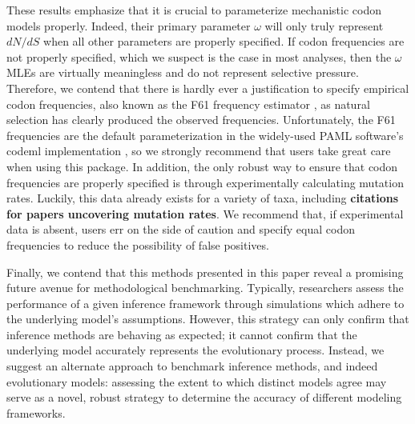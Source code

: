 \documentclass[11pt]{article}
\begin{document}
These results emphasize that it is crucial to parameterize mechanistic codon models properly. Indeed, their primary parameter $\omega$ will only truly represent $dN/dS$ when all other parameters are properly specified. If codon frequencies are not properly specified, which we suspect is the case in most analyses, then the $\omega$ MLEs are virtually meaningless and do not represent selective pressure. Therefore, we contend that there is hardly ever a justification to specify empirical codon frequencies, also known as the F61 frequency estimator \cite{GoldmanYang1994}, as natural selection has clearly produced the observed frequencies. Unfortunately, the F61 frequencies are the default parameterization in the widely-used PAML software's codeml implementation \cite{Yang2007}, so we strongly recommend that users take great care when using this package.
In addition, the only robust way to ensure that codon frequencies are properly specified is through experimentally calculating mutation rates. Luckily, this data already exists for a variety of taxa, including \textbf{citations for papers uncovering mutation rates}.  We recommend that, if experimental data is absent, users err on the side of caution and specify equal codon frequencies to reduce the possibility of false positives.


Finally, we contend that this methods presented in this paper reveal a promising future avenue for methodological benchmarking. Typically, researchers assess the performance of a given inference framework through simulations which adhere to the underlying model's assumptions. However, this strategy can only confirm that inference methods are behaving as expected; it cannot confirm that the underlying model accurately represents the evolutionary process. Instead, we suggest an alternate approach to benchmark inference methods, and indeed evolutionary models: assessing the extent to which distinct models agree may serve as a novel, robust strategy to determine the accuracy of different modeling frameworks.




\end{document}
